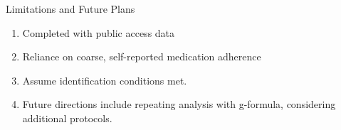 \documentclass{beamer}
\begin{document}
    \begin{frame}{Limitations and Future Plans}

    \begin{enumerate}
        \item Completed with public access data\footnotemark[1]
        \item Reliance on coarse, self-reported medication adherence
        \item Assume identification conditions met.\footnotemark[2]
        \item Future directions include repeating analysis with g-formula, considering additional protocols. 
    \end{enumerate}

    \end{frame}
\end{document}
